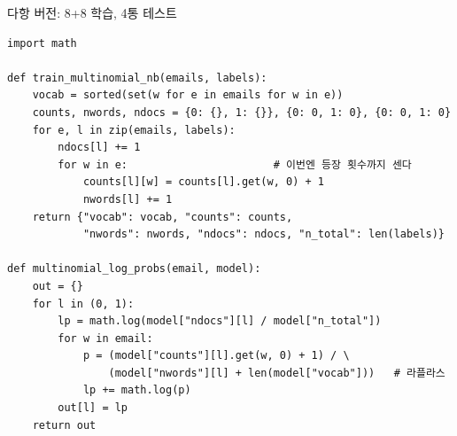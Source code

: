 \begin{frame}[fragile]{다항 버전: 8+8 학습, 4통 테스트}
  \begin{lstlisting}
import math

def train_multinomial_nb(emails, labels):
    vocab = sorted(set(w for e in emails for w in e))
    counts, nwords, ndocs = {0: {}, 1: {}}, {0: 0, 1: 0}, {0: 0, 1: 0}
    for e, l in zip(emails, labels):
        ndocs[l] += 1
        for w in e:                       # 이번엔 등장 횟수까지 센다
            counts[l][w] = counts[l].get(w, 0) + 1
            nwords[l] += 1
    return {"vocab": vocab, "counts": counts,
            "nwords": nwords, "ndocs": ndocs, "n_total": len(labels)}

def multinomial_log_probs(email, model):
    out = {}
    for l in (0, 1):
        lp = math.log(model["ndocs"][l] / model["n_total"])
        for w in email:
            p = (model["counts"][l].get(w, 0) + 1) / \
                (model["nwords"][l] + len(model["vocab"]))   # 라플라스
            lp += math.log(p)
        out[l] = lp
    return out
  \end{lstlisting}
\end{frame}

